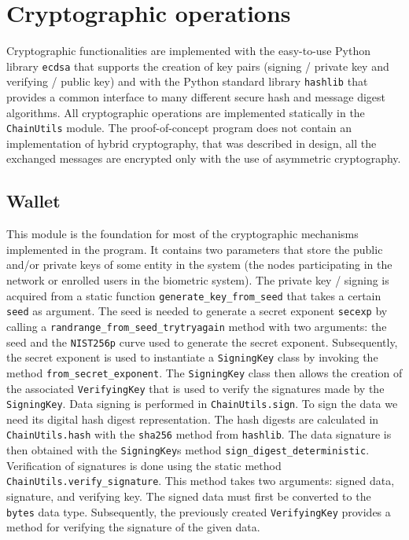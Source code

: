 \section{Cryptographic operations}
\label{Cryptographic operations}
Cryptographic functionalities are implemented with the easy-to-use Python library \texttt{ecdsa} that supports the creation of key pairs (signing / private key and verifying / public key) and with the Python standard library \texttt{hashlib} that provides a common interface to many different secure hash and message digest algorithms. All cryptographic operations are implemented statically in the \texttt{ChainUtils} module. The proof-of-concept program does not contain an implementation of hybrid cryptography, that was described in design, all the exchanged messages are encrypted only with the use of asymmetric cryptography.

\subsection{Wallet}
This module is the foundation for most of the cryptographic mechanisms implemented in the program. It contains two parameters that store the public and/or private keys of some entity in the system (the nodes participating in the network or enrolled users in the biometric system). The private key / signing is acquired from a static function \texttt{generate\_key\_from\_seed} that takes a certain \texttt{seed} as argument. The seed is needed to generate a secret exponent \texttt{secexp} by calling a \texttt{randrange\_from\_seed\_trytryagain} method with two arguments: the seed and the \texttt{NIST256p} curve used to generate the secret exponent. Subsequently, the secret exponent is used to instantiate a \texttt{SigningKey} class by invoking the method \texttt{from\_secret\_exponent}. The \texttt{SigningKey} class then allows the creation of the associated \texttt{VerifyingKey} that is used to verify the signatures made by the \texttt{SigningKey}. Data signing is performed in \texttt{ChainUtils.sign}. To sign the data we need its digital hash digest representation. The hash digests are calculated in \texttt{ChainUtils.hash} with the \texttt{sha256} method from \texttt{hashlib}. The data signature is then obtained with the \texttt{SigningKey}s method \texttt{sign\_digest\_deterministic}. Verification of signatures is done using the static method \texttt{ChainUtils.verify\_signature}. This method takes two arguments: signed data, signature, and verifying key. The signed data must first be converted to the \texttt{bytes} data type. Subsequently, the previously created \texttt{VerifyingKey} provides a method for verifying the signature of the given data. 
